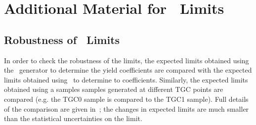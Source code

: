 \clearpage
\appendix
{}

\graphicspath{{Chapters/AppendixTGC/Figures/}}
\chapter{Additional Material for \TGC\ Limits }
\label{appendix:TGC}

\section{Robustness of \TGC\ Limits}
\label{appendix:TGC-Robustness}

In order to check the robustness of the limits, the expected limits obtained
using the \BR\ generator to determine the yield coefficients are compared with
the expected limits obtained using \BHO\ to determine to coefficients.
Similarly, the expected limits obtained using a samples samples generated at
different TGC points are compared (e.g. the TGC0 sample is compared to the TGC1
sample). Full details of the comparison are given
in~; the changes in expected limits are much smaller
than the statistical uncertainties on the limit.

